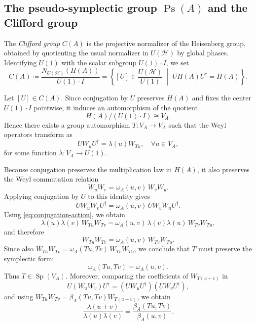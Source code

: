 \documentclass[11pt, reqno]{amsart}
\theoremstyle{definition}
\theoremstyle{remark}
\newcommand{\HH}{\mathcal{H}}
\DeclareMathOperator{\Sp}{Sp}
\DeclareMathOperator{\Ps}{Ps}
\begin{document}


\subsection{The pseudo-symplectic group \texorpdfstring{$\Ps(A)$}{Ps(A)} and the Clifford group}

The \emph{Clifford group} $C(A)$ is the projective normalizer of the Heisenberg group, obtained by quotienting the usual normalizer in $U(\HH)$ by global phases. Identifying $U(1)$ with the scalar subgroup $U(1)\cdot I$, we set
\begin{equation}
C(A) \coloneqq \frac{N_{U(\HH)}(H(A))}{U(1) \cdot I} = \left\{ [U] \in \frac{U(\HH)}{U(1)} \;\middle|\; U H(A) U^\dagger = H(A) \right\}.
\end{equation}

Let $[U] \in C(A)$. Since conjugation by $U$ preserves $H(A)$ and fixes the center $U(1)\cdot I$ pointwise, it induces an automorphism of the quotient
\[
H(A)/(U(1)\cdot I) \cong V_A.
\]
Hence there exists a group automorphism $T: V_A \to V_A$ such that the Weyl operators transform as
\begin{equation}\label{eq:conjugation-action}
    U W_u U^\dagger = \lambda(u) W_{Tu}, \quad \forall u \in V_A,
\end{equation}
for some function $\lambda: V_A \to U(1)$.

Because conjugation preserves the multiplication law in $H(A)$, it also preserves the Weyl commutation relation
\[
W_uW_v=\omega_A(u,v)\,W_vW_u.
\]
Applying conjugation by $U$ to this identity gives
\[
U W_u W_v U^\dagger = \omega_A(u,v)\,U W_v W_u U^\dagger.
\]
Using \eqref{eq:conjugation-action}, we obtain
\[
\lambda(u)\lambda(v)\,W_{Tu}W_{Tv}
=
\omega_A(u,v)\,\lambda(v)\lambda(u)\,W_{Tv}W_{Tu},
\]
and therefore
\[
W_{Tu}W_{Tv}=\omega_A(u,v)\,W_{Tv}W_{Tu}.
\]
Since also $W_{Tu}W_{Tv}=\omega_A(Tu,Tv)\,W_{Tv}W_{Tu}$, we conclude that $T$ must preserve the symplectic form:
\begin{equation}
    \omega_A(Tu, Tv) = \omega_A(u, v).
\end{equation}
Thus $T \in \Sp(V_A)$. Moreover, comparing the coefficients of $W_{T(u+v)}$ in
\[
U(W_uW_v)U^\dagger = (UW_uU^\dagger)(UW_vU^\dagger),
\]
and using $W_{Tu}W_{Tv} = \beta_A(Tu, Tv) W_{T(u+v)}$, we obtain
\begin{equation}\label{eq:coboundary-condition}
    \frac{\lambda(u+v)}{\lambda(u)\lambda(v)} = \frac{\beta_A(Tu, Tv)}{\beta_A(u, v)}.
\end{equation}
\end{document}
